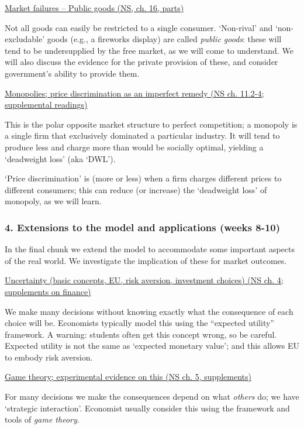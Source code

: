 \documentclass[]{article}
\begin{document}
\underline{Market failures -- Public goods (NS, ch. 16, parts)}

Not all goods can easily be restricted to a single consumer. `Non-rival' and `non-excludable' goods (e.g., a fireworks display) are called \emph{public goods}: these will tend to be undersupplied by the free market, as we will come to understand. We will also discuss the evidence for the private provision of these, and consider government's ability to provide them.

\underline{Monopolies; price discrimination as an imperfect remedy (NS ch. 11.2-4; supplemental readings)}

This is the polar opposite market structure to perfect competition; a monopoly is a single firm that exclusively dominated a particular industry. It will tend to produce less and charge more than would be socially optimal, yielding a `deadweight loss' (aka `DWL').

`Price discrimination' is (more or less) when a firm charges different prices to different consumers; this can reduce (or increase) the `deadweight loss' of monopoly, as we will learn.

\hypertarget{extensions-to-the-model-and-applications-weeks-8-10}{%
\subsubsection{4. Extensions to the model and applications (weeks 8-10)}\label{extensions-to-the-model-and-applications-weeks-8-10}}

In the final chunk we extend the model to accommodate some important aspects of the real world. We investigate the implication of these for market outcomes.

\underline{Uncertainty (basic concepts, EU, risk aversion, investment choices) (NS ch. 4; supplements on finance)}

We make many decisions without knowing exactly what the consequence of each choice will be. Economists typically model this using the ``expected utility'' framework. A warning: students often get this concept wrong, so be careful. Expected utility is not the same as `expected monetary value'; and this allows EU to embody risk aversion.

\underline{Game theory; experimental evidence on this (NS ch. 5, supplements)}

For many decisions we make the consequences depend on what \emph{others} do; we have `strategic interaction'. Economist usually consider this using the framework and tools of \emph{game theory}.
\end{document}

